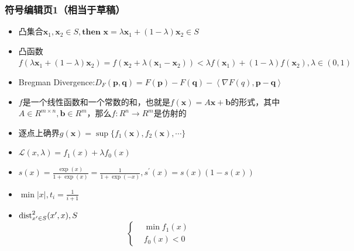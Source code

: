 \documentclass{beamer}
\begin{document}
\begin{frame}\frametitle{符号编辑页1（相当于草稿）}
\begin{itemize}
\item 凸集合$\bm{x}_1,\bm{x}_2 \in S,\textbf{then } \bm{x}=\lambda \bm{x}_1+(1-\lambda)\bm{x}_2 \in S$
\item 凸函数$f(\lambda \bm{x}_1+(1-\lambda)\bm{x}_2)=f(\bm{x}_2+\lambda(\bm{x}_1-\bm{x}_2))<\lambda f(\bm{x}_1)+(1-\lambda)f(\bm{x}_2),\lambda \in (0,1)$
\item Bregman Divergence:$D_{F}(\bm{p},\bm{q})=F(\bm{p})-F(\bm{q})-\left<\nabla F(q),\bm{p}-\bm{q}\right>$
\item $f$是一个线性函数和一个常数的和，也就是$f(\bm{x})=A\bm{x}+\bm{b}$的形式，其中$A\in R^{m\times n},\bm{b} \in R^m$，那么$f:R^n\rightarrow R^m$是仿射的
\item 逐点上确界$g(\bm{x})=\sup \{f_{1}(\bm{x}),f_{2}(\bm{x}),\cdots\}$
\item $\mathcal{L}(x,\lambda)=f_1(x)+\lambda f_{0}(x)$
\item $s(x)=\frac{\exp(x)}{1+\exp(x)}=\frac{1}{1+\exp(-x)},s^{\prime}(x)=s(x)(1-s(x))$
\item $\min |x|,t_i=\frac{1}{i+1}$
\item ${\rm dist}^{2}_{x^{\prime}\in S}(x^{\prime},x),S$
\begin{equation}
\left\{
\begin{split}
&\min f_1(x)\\
&f_{0}(x)<0
\end{split}
\right.
\end{equation}
\end{itemize}
\end{frame}
\end{document}
